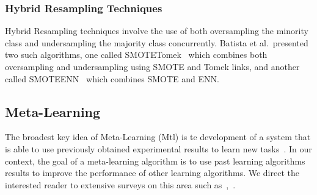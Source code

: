 \documentclass{article}
\begin{document}
\subsubsection{Hybrid Resampling Techniques}
Hybrid Resampling techniques involve the use of both oversampling the minority class and undersampling the majority class concurrently. Batista et al.\ presented two such algorithms, one called SMOTETomek~\cite{batistaBalancingTrainingData2003} which combines both oversampling and undersampling using SMOTE and Tomek links, and another called SMOTEENN~\cite{batistaStudyBehaviorSeveral2004} which combines SMOTE and ENN.\@

\subsection{Meta-Learning}


The broadest key idea of Meta-Learning (Mtl) is te development of a system that is able to use previously obtained experimental results to learn new tasks~\cite{vanschorenMetaLearningSurvey2018}. In our context, the goal of a meta-learning algorithm is to use past learning algorithms results to improve the performance of other learning algorithms. We direct the interested reader to extensive surveys on this area such as~\cite{vanschorenMetaLearningSurvey2018},~\cite{pengComprehensiveOverviewSurvey2020}.
\end{document}
